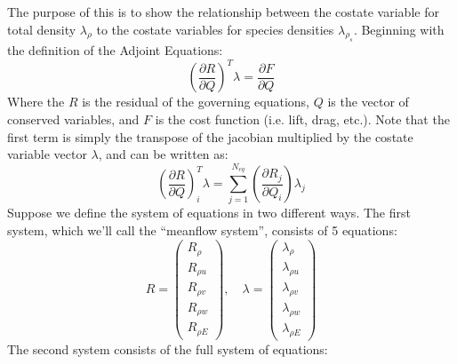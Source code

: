 The purpose of this is to show the relationship between the costate variable for total density $\lambda_\rho$ to the costate variables for species densities $\lambda_{\rho_s}$. Beginning with the definition of the Adjoint Equations:
\begin{equation}
  \left(\frac{\partial R}{\partial Q}\right)^T\lambda = \frac{\partial F}{\partial Q}
  \label{adj_eqn}
\end{equation}
Where the $R$ is the residual of the governing equations, $Q$ is the vector of conserved variables, and $F$ is the cost function (i.e. lift, drag, etc.). Note that the first term is simply the transpose of the jacobian multiplied by the costate variable vector $\lambda$, and can be written as:
\begin{equation}
  \left(\frac{\partial R}{\partial Q}\right)_i^T \lambda 
  = \sum_{j=1}^{N_{eq}}{
    \left(\frac{\partial R_j}{\partial Q_i}\right) \lambda_j}
  \label{lhs_sum}
\end{equation}
Suppose we define the system of equations in two different ways.  The first system, which we'll call the ``meanflow system'', consists of 5 equations:
\begin{equation}
  R = \begin{pmatrix} 
        R_{\rho} \\ R_{\rho u} \\ R_{\rho v} \\ R_{\rho w} \\ R_{\rho E}
      \end{pmatrix}, \quad
      \lambda = \begin{pmatrix}
        \lambda_\rho \\ \lambda_{\rho u} \\ \lambda_{\rho v} \\ \lambda_{\rho w} \\
        \lambda_{\rho E}
      \end{pmatrix}
  \label{5x5}
\end{equation}
The second system consists of the full system of equations:
